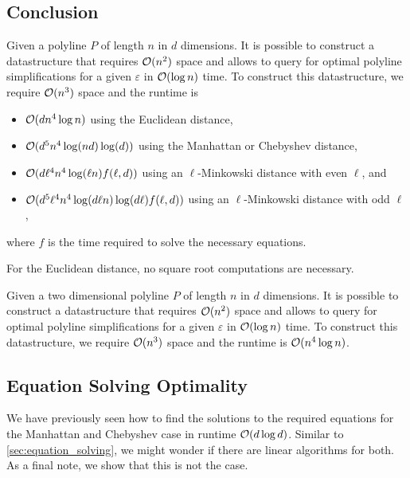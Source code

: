 \subsection{Conclusion}

\begin{theorem}\label{thm:query-ds}
	Given a polyline \(P\) of length \(n\) in \(d\) dimensions. It is possible to construct a datastructure that requires \(\mathcal{O}(n^2)\) space and allows to query for optimal polyline simplifications for a given \(\varepsilon\) in \(\mathcal{O}(\log n)\) time. To construct this datastructure, we require \(\mathcal{O}(n^3)\) space and the runtime is 
	\begin{itemize}
		\item \(\mathcal{O}(d n^4 \log n)\) using the Euclidean distance, 
		\item \(\mathcal{O}(d^5 n^4 \log(nd)\log(d))\) using the Manhattan or Chebyshev distance, 
		\item \(\mathcal{O}(d\ell^4 n^4 \log(\ell n)f(\ell, d))\) using an \(\ell\)-Minkowski distance with even \(\ell\), and 
		\item \(\mathcal{O}(d^5\ell^4 n^4 \log(d \ell n)\log(d \ell)f(\ell, d))\) using an \(\ell\)-Minkowski distance with odd \(\ell\),
	\end{itemize}

	where \(f\) is the time required to solve the necessary equations.

	For the Euclidean distance, no square root computations are necessary.
\end{theorem}

\begin{corollary}
	Given a two dimensional polyline \(P\) of length \(n\) in \(d\) dimensions. It is possible to construct a datastructure that requires \(\mathcal{O}(n^2)\) space and allows to query for optimal polyline simplifications for a given \(\varepsilon\) in \(\mathcal{O}(\log n)\) time. To construct this datastructure, we require \(\mathcal{O}(n^3)\) space and the runtime is \(\mathcal{O}(n^4 \log n)\).
\end{corollary}

\subsection{Equation Solving Optimality}
We have previously seen how to find the solutions to the required equations for the Manhattan and Chebyshev case in runtime \(\mathcal{O}(d \log d)\). Similar to \cref{sec:equation_solving}, we might wonder if there are linear algorithms for both. As a final note, we show that this is not the case. 

